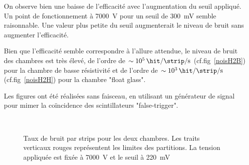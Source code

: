 On observe bien une baisse de l'efficacité avec l'augmentation du seuil appliqué. Un point de fonctionnement à \SI{7000}{\volt} pour un seuil de \SI{300}{\milli\volt} semble raisonnable. Une valeur plus petite du seuil augmenterait le niveau de bruit sans augmenter l'efficacité.

Bien que l'efficacité semble correspondre à l'allure attendue, le niveau de bruit des chambres est très élevé, de l'ordre de $\sim\SI{e5}{\hit\per\strip\per\second}$ (cf.fig~\ref{noisH2B}) pour la chambre de basse résistivité et de l'ordre de $\sim\SI{e3}{\hit\per\strip\per\second}$ (cf.fig~\ref{noisH2H}) pour la chambre "float glass". 

Les figures ont été réalisées sans faisceau, en utilisant un générateur de signal pour mimer la coïncidence des scintillateurs "false-trigger".

\begin{figure}[ht!]
	\centering
	\vspace*{2.5cm}
	\\
	\vspace*{2.5cm}
	\caption{Taux de bruit par strips pour les deux chambres. Les traits verticaux rouges représentent les limites des partitions. La tension appliquée est fixée à \SI{7000}{\volt} et le seuil à \SI{220}{\milli\volt}}
\end{figure}



